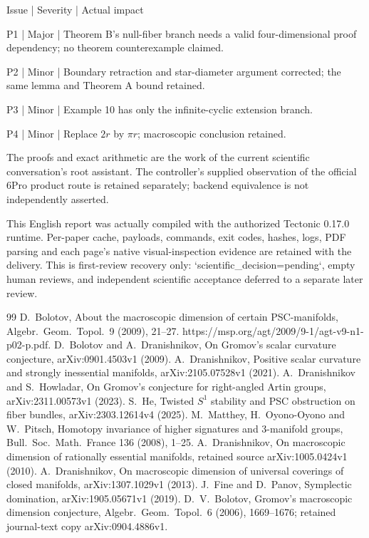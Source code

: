 \documentclass[10pt]{article}
\begin{document}
Issue | Severity | Actual impact\par
P1 | Major | Theorem B’s null-fiber branch needs a valid four-dimensional proof dependency; no theorem counterexample claimed.\par
P2 | Minor | Boundary retraction and star-diameter argument corrected; the same lemma and Theorem A bound retained.\par
P3 | Minor | Example 10 has only the infinite-cyclic extension branch.\par
P4 | Minor | Replace \(2r\) by \(\pi r\); macroscopic conclusion retained.\par
The proofs and exact arithmetic are the work of the current scientific conversation’s root assistant. The controller’s supplied observation of the official 6Pro product route is retained separately; backend equivalence is not independently asserted.\par
This English report was actually compiled with the authorized Tectonic 0.17.0 runtime. Per-paper cache, payloads, commands, exit codes, hashes, logs, PDF parsing and each page’s native visual-inspection evidence are retained with the delivery. This is first-review recovery only: `scientific\_decision=pending`, empty human reviews, and independent scientific acceptance deferred to a separate later review.\par
99 D. Bolotov, About the macroscopic dimension of certain PSC-manifolds, Algebr. Geom. Topol. 9 (2009), 21–27. https://msp.org/agt/2009/9-1/agt-v9-n1-p02-p.pdf. D. Bolotov and A. Dranishnikov, On Gromov’s scalar curvature conjecture, arXiv:0901.4503v1 (2009). A. Dranishnikov, Positive scalar curvature and strongly inessential manifolds, arXiv:2105.07528v1 (2021). A. Dranishnikov and S. Howladar, On Gromov’s conjecture for right-angled Artin groups, arXiv:2311.00573v1 (2023). S. He, Twisted \(S^1\) stability and PSC obstruction on fiber bundles, arXiv:2303.12614v4 (2025). M. Matthey, H. Oyono-Oyono and W. Pitsch, Homotopy invariance of higher signatures and 3-manifold groups, Bull. Soc. Math. France 136 (2008), 1–25. A. Dranishnikov, On macroscopic dimension of rationally essential manifolds, retained source arXiv:1005.0424v1 (2010). A. Dranishnikov, On macroscopic dimension of universal coverings of closed manifolds, arXiv:1307.1029v1 (2013). J. Fine and D. Panov, Symplectic domination, arXiv:1905.05671v1 (2019). D. V. Bolotov, Gromov’s macroscopic dimension conjecture, Algebr. Geom. Topol. 6 (2006), 1669–1676; retained journal-text copy arXiv:0904.4886v1.\par
\end{document}
